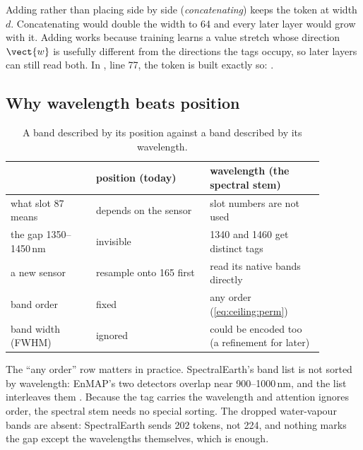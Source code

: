 Adding rather than placing side by side (\emph{concatenating}) keeps the token at width $d$. Concatenating would double the width to 64 and every later layer would grow with it. Adding works because training learns a value stretch whose direction $\vect{w}$ is usefully different from the directions the tags occupy, so later layers can still read both. In , line 77, the token is built exactly so: .


\subsection{Why wavelength beats position}

\begin{table}[htbp]\centering
\caption{A band described by its position against a band described by its wavelength.}\label{tab:ceiling:wlvspos}
\begin{tabular}{p{0.24\linewidth}p{0.32\linewidth}p{0.32\linewidth}}\toprule
 & position (today) & wavelength (the spectral stem)\\\midrule
what slot 87 means & depends on the sensor & slot numbers are not used\\
the gap 1350--1450\,nm & invisible & 1340 and 1460 get distinct tags\\
a new sensor & resample onto 165 first & read its native bands directly\\
band order & fixed & any order (\cref{eq:ceiling:perm})\\
band width (FWHM) & ignored & could be encoded too (a refinement for later)\\\bottomrule
\end{tabular}
\end{table}

{\sloppy The ``any order'' row matters in practice. SpectralEarth's band list is not sorted by wavelength: EnMAP's two detectors overlap near 900--1000\,nm, and the list interleaves them . Because the tag carries the wavelength and attention ignores order, the spectral stem needs no special sorting. The dropped water-vapour bands are absent: SpectralEarth sends 202 tokens, not 224, and nothing marks the gap except the wavelengths themselves, which is enough.\par}

